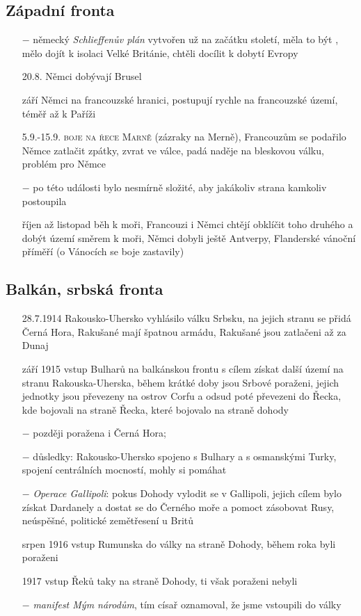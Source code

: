 \documentclass{article}
\begin{document}
\subsection*{Západní fronta}
\begin{itemize}
    \vspace{-0.5em}
    \setlength\itemsep{0.15em}
    \item[$-$] německý \textit{Schlieffenův plán} vytvořen už na začátku století, měla to být , mělo dojít k isolaci Velké Británie, chtěli docílit k dobytí Evropy
    \item[20.8.] Němci dobývají Brusel
    \item[září] Němci na francouzské hranici, postupují rychle na francouzské území, téměř až k Paříži
    \item[5.9.-15.9.] \textsc{boje na řece Marně} (zázraky na Merně), Francouzům se podařilo Němce zatlačit zpátky, zvrat ve válce, padá naděje na bleskovou válku, problém pro Němce
    \item[$-$] po této události bylo nesmírně složité, aby jakákoliv strana kamkoliv postoupila
    \item[říjen až listopad] běh k moři, Francouzi i Němci chtějí obklíčit toho druhého a dobýt území směrem k moři, Němci dobyli ještě Antverpy, Flanderské vánoční příměří (o Vánocích se boje zastavily)
\end{itemize}

\subsection*{Balkán, srbská fronta}
\begin{itemize}
    \vspace{-0.5em}
    \setlength\itemsep{0.15em}
    \item[28.7.1914] Rakousko-Uhersko vyhlásilo válku Srbsku, na jejich stranu se přidá Černá Hora, Rakušané mají špatnou armádu, Rakušané jsou zatlačeni až za Dunaj
    \item[září 1915] vstup Bulharů na balkánskou frontu s cílem získat další území na stranu Rakouska-Uherska, během krátké doby jsou Srbové poraženi, jejich jednotky jsou převezeny na ostrov Corfu a odsud poté převezeni do Řecka, kde bojovali na straně   Řecka, které bojovalo na straně dohody
    \item[$-$] později poražena i Černá Hora;
    \item[$-$] důsledky: Rakousko-Uhersko  spojeno s Bulhary a s osmanskými Turky, spojení centrálních mocností, mohly si pomáhat
    \item[$-$] \textit{Operace Gallipoli}: pokus Dohody vylodit se v Gallipoli, jejich cílem bylo získat Dardanely a dostat se do Černého moře a pomoct zásobovat Rusy, neúspěšné, politické zemětřesení u Britů
    \item[srpen 1916] vstup Rumunska do války na straně Dohody, během roka byli poraženi
    \item[1917] vstup Řeků taky na straně Dohody, ti však poraženi nebyli
    \item[$-$] \textit{manifest Mým národům}, tím císař oznamoval, že jsme vstoupili do války
\end{itemize}
\end{document}
